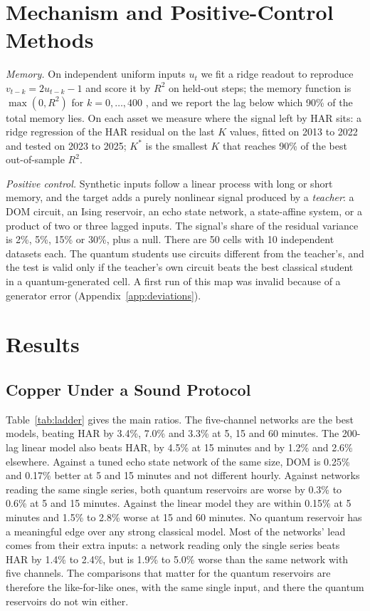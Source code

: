 \documentclass{ieeeaccess}
\begin{document}
\section{Mechanism and Positive-Control Methods}
\label{sec:methods-mech}
\textit{Memory.} On independent uniform inputs $u_t$ we fit a ridge readout to reproduce $v_{t-k}=2u_{t-k}-1$ and score it by $R^2$ on held-out steps; the memory function is $\max(0,R^2)$ for $k=0,\dots,400$ \cite{dambre2012}, and we report the lag below which 90\% of the total memory lies. On each asset we measure where the signal left by HAR sits: a ridge regression of the HAR residual on the last $K$ values, fitted on 2013 to 2022 and tested on 2023 to 2025; $K^*$ is the smallest $K$ that reaches 90\% of the best out-of-sample $R^2$.

\textit{Positive control.} Synthetic inputs follow a linear process with long or short memory, and the target adds a purely nonlinear signal produced by a \emph{teacher}: a DOM circuit, an Ising reservoir, an echo state network, a state-affine system, or a product of two or three lagged inputs. The signal's share of the residual variance is 2\%, 5\%, 15\% or 30\%, plus a null. There are 50 cells with 10 independent datasets each. The quantum students use circuits different from the teacher's, and the test is valid only if the teacher's own circuit beats the best classical student in a quantum-generated cell. A first run of this map was invalid because of a generator error (Appendix~\ref{app:deviations}).

\section{Results}
\label{sec:results}

\subsection{Copper Under a Sound Protocol}
\label{sec:res-copper}
Table~\ref{tab:ladder} gives the main ratios. The five-channel networks are the best models, beating HAR by 3.4\%, 7.0\% and 3.3\% at 5, 15 and 60 minutes. The 200-lag linear model also beats HAR, by 4.5\% at 15 minutes and by 1.2\% and 2.6\% elsewhere. Against a tuned echo state network of the same size, DOM is 0.25\% and 0.17\% better at 5 and 15 minutes and not different hourly. Against networks reading the same single series, both quantum reservoirs are worse by 0.3\% to 0.6\% at 5 and 15 minutes. Against the linear model they are within 0.15\% at 5 minutes and 1.5\% to 2.8\% worse at 15 and 60 minutes. No quantum reservoir has a meaningful edge over any strong classical model. Most of the networks' lead comes from their extra inputs: a network reading only the single series beats HAR by 1.4\% to 2.4\%, but is 1.9\% to 5.0\% worse than the same network with five channels. The comparisons that matter for the quantum reservoirs are therefore the like-for-like ones, with the same single input, and there the quantum reservoirs do not win either.
\end{document}
